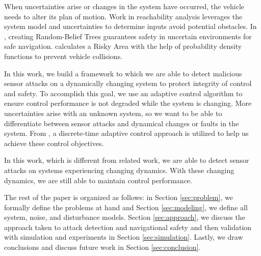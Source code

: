 When uncertainties arise or changes in the system have occurred, the vehicle needs to alter its plan of motion. Work in reachability analysis \cite{8046382,7799325,5980268} leverages the system model and uncertainties to determine inputs avoid potential obstacles. In \cite{5980508}, creating Random-Belief Trees guarantees safety in uncertain environments for safe navigation. \cite{6934041} calculates a Risky Area with the help of probability density functions to prevent vehicle collisions.


In this work, we build a framework to which we are able to detect malicious sensor attacks on a dynamically changing system to protect integrity of control and safety. To accomplish this goal, we use an adaptive control algorithm to ensure control performance is not degraded while the system is changing. More uncertainties arise with an unknown system, so we want to be able to differentiate between sensor attacks and dynamical changes or faults in the system. From \cite{tao2003adaptive,Goodwin:2009:AFP:1643720}, a  discrete-time adaptive control approach is utilized to help us achieve these control objectives.

In this work, which is different from related work, we are able to detect sensor attacks on systems experiencing changing dynamics. With these changing dynamics, we are still able to maintain control performance.

The rest of the paper is organized as follows: in Section \ref{sec:problem}, we formally define the problems at hand and Section \ref{sec:modeling}, we define all system, noise, and disturbance models. Section \ref{sec:approach}, we discuss the approach taken to attack detection and navigational safety and then validation with simulation and experiments in Section \ref{sec:simulation}. Lastly, we draw conclusions and discuss future work in Section \ref{sec:conclusion}.

